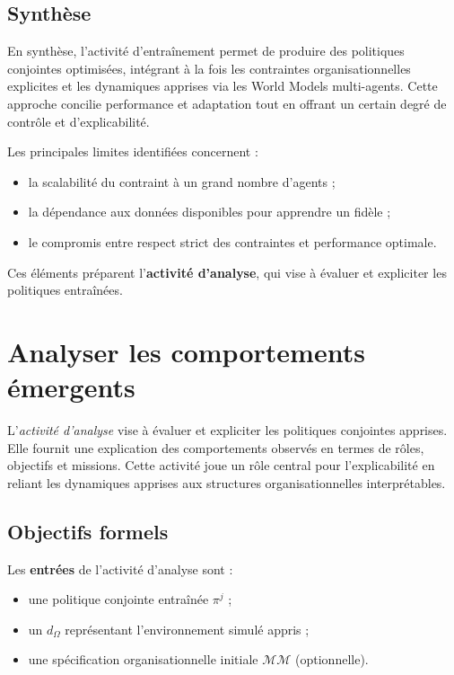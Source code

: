\section{Synthèse}

En synthèse, l’activité d’entraînement permet de produire des politiques conjointes optimisées, intégrant à la fois les contraintes organisationnelles explicites et les dynamiques apprises via les World Models multi-agents.
Cette approche concilie performance et adaptation tout en offrant un certain degré de contrôle et d’explicabilité.

Les principales limites identifiées concernent :
\begin{itemize}
    \item la scalabilité du  contraint à un grand nombre d’agents ;
    \item la dépendance aux données disponibles pour apprendre un  fidèle ;
    \item le compromis entre respect strict des contraintes et performance optimale.
\end{itemize}

Ces éléments préparent l’\textbf{activité d’analyse}, qui vise à évaluer et expliciter les politiques entraînées.


\clearpage
\thispagestyle{empty}
\null
\newpage

\chapter{Analyser les comportements émergents}
\label{chap:analyzing}

L'\textit{activité d’analyse} vise à évaluer et expliciter les politiques conjointes apprises. Elle fournit une explication des comportements observés en termes de rôles, objectifs et missions. Cette activité joue un rôle central pour l’explicabilité en reliant les dynamiques apprises aux structures organisationnelles interprétables.


\section*{Objectifs formels}


Les \textbf{entrées} de l’activité d’analyse sont :
\begin{itemize}
    \item une politique conjointe entraînée $\pi^j$ ;
    \item un  $d_\Omega$ représentant l’environnement simulé appris ;
    \item une spécification organisationnelle initiale $\mathcal{MM}$ (optionnelle).
\end{itemize}

